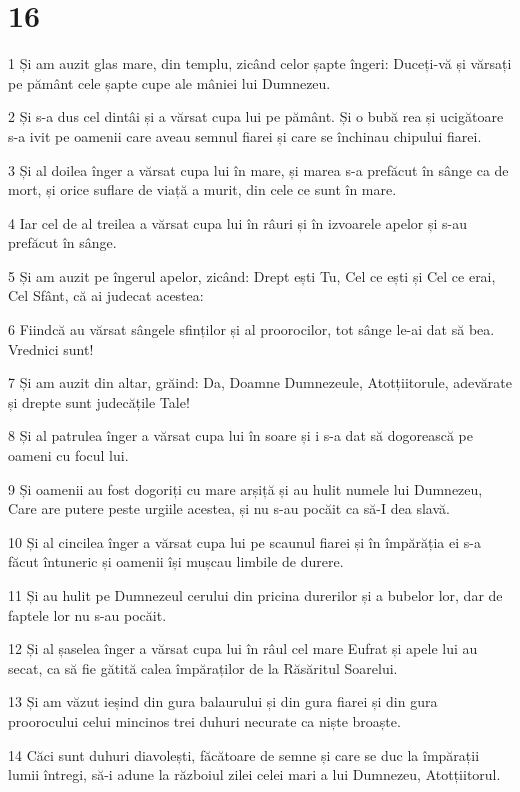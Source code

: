 \chapter{16}

\par 1 Și am auzit glas mare, din templu, zicând celor șapte îngeri: Duceți-vă și vărsați pe pământ cele șapte cupe ale mâniei lui Dumnezeu.
\par 2 Și s-a dus cel dintâi și a vărsat cupa lui pe pământ. Și o bubă rea și ucigătoare s-a ivit pe oamenii care aveau semnul fiarei și care se închinau chipului fiarei.
\par 3 Și al doilea înger a vărsat cupa lui în mare, și marea s-a prefăcut în sânge ca de mort, și orice suflare de viață a murit, din cele ce sunt în mare.
\par 4 Iar cel de al treilea a vărsat cupa lui în râuri și în izvoarele apelor și s-au prefăcut în sânge.
\par 5 Și am auzit pe îngerul apelor, zicând: Drept ești Tu, Cel ce ești și Cel ce erai, Cel Sfânt, că ai judecat acestea:
\par 6 Fiindcă au vărsat sângele sfinților și al proorocilor, tot sânge le-ai dat să bea. Vrednici sunt!
\par 7 Și am auzit din altar, grăind: Da, Doamne Dumnezeule, Atotțiitorule, adevărate și drepte sunt judecățile Tale!
\par 8 Și al patrulea înger a vărsat cupa lui în soare și i s-a dat să dogorească pe oameni cu focul lui.
\par 9 Și oamenii au fost dogoriți cu mare arșiță și au hulit numele lui Dumnezeu, Care are putere peste urgiile acestea, și nu s-au pocăit ca să-I dea slavă.
\par 10 Și al cincilea înger a vărsat cupa lui pe scaunul fiarei și în împărăția ei s-a făcut întuneric și oamenii își mușcau limbile de durere.
\par 11 Și au hulit pe Dumnezeul cerului din pricina durerilor și a bubelor lor, dar de faptele lor nu s-au pocăit.
\par 12 Și al șaselea înger a vărsat cupa lui în râul cel mare Eufrat și apele lui au secat, ca să fie gătită calea împăraților de la Răsăritul Soarelui.
\par 13 Și am văzut ieșind din gura balaurului și din gura fiarei și din gura proorocului celui mincinos trei duhuri necurate ca niște broaște.
\par 14 Căci sunt duhuri diavolești, făcătoare de semne și care se duc la împărații lumii întregi, să-i adune la războiul zilei celei mari a lui Dumnezeu, Atotțiitorul.
